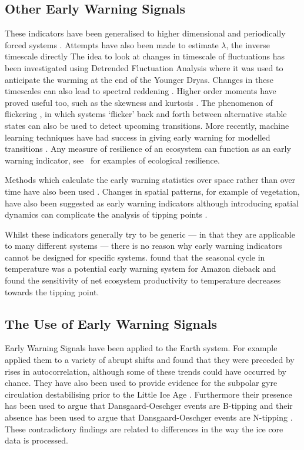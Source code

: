 \subsection{Other Early Warning Signals}
These indicators have been generalised to higher dimensional and periodically forced systems \parencite{Williamson2015,Williamson2016}. Attempts have also been made to estimate
$\lambda$, the inverse timescale directly \parencite{Boettner2022,Boers2021a} The idea to look at
changes in timescale of fluctuations has been investigated using Detrended Fluctuation Analysis \parencite{Livina2007} where it was used to anticipate the warming at the
end of the Younger Dryas. Changes in these timescales can also lead to spectral reddening \parencite{Kleinen2003}. Higher order moments have proved useful too, such as the
skewness \parencite{Guttal2008} and kurtosis \parencite{Xie2019}. The phenomenon of flickering \parencite{Wang2012}, in which systems `flicker' back and forth between alternative stable
states can also be used to detect upcoming transitions. More recently, machine learning techniques have had success in giving early warning for modelled transitions \parencite{Bury2021}.
Any measure of resilience of an ecosystem can function as an early warning indicator, see~\cite{Krakovska2023} for examples of ecological resilience.


Methods which calculate the early warning statistics over space rather than over time have also been used \parencite{Donangelo2010,Guttal2009}. Changes in spatial
patterns, for example of vegetation, have also been suggested as early warning indicators \parencite{Kefi2007,Kefi2014} although introducing spatial dynamics can complicate the analysis
of tipping points \parencite{Rietkerk2021}.

Whilst these indicators generally try to be generic --- in that they are applicable to many different systems --- there is no reason why early warning indicators cannot be designed for specific systems.
\cite{Parry2022} found that the seasonal cycle in temperature was a potential early warning system for Amazon dieback and~\cite{Boulton2013} found the sensitivity of net ecosystem productivity to temperature decreases
towards the tipping point.

\subsection{The Use of Early Warning Signals}
Early Warning Signals have been applied to the Earth system. For example~\cite{Dakos2008} applied them to a variety of abrupt shifts and found that they were preceded by rises in autocorrelation,
although some of these trends could have occurred by chance. They have also been used to provide evidence for the subpolar gyre circulation destabilising prior to the
Little Ice Age \parencite{Arellano-Nava2022}. Furthermore their presence has been
used to argue that Dansgaard-Oeschger events are B-tipping \parencite{Boers2018a} and their absence has been used to argue that Dansgaard-Oeschger events are N-tipping \parencite{Ditlevsen2010}.
These contradictory findings
are related to differences in the way the ice core data is processed.

